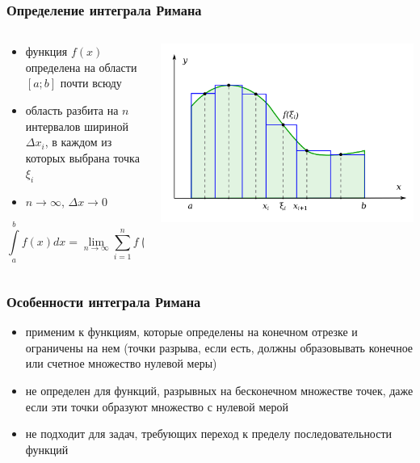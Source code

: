\documentclass[aspectratio=169]{beamer}
\begin{document}
\begin{frame}
\frametitle{Определение интеграла Римана}
\begin{columns}[c]
    \begin{column}{0.45\textwidth}
        \begin{itemize}
            \item функция $f(x)$ определена на области $[a; b]$ почти всюду
            \item область разбита на $n$ интервалов шириной $\Delta x_i$, в каждом из которых выбрана точка $\xi_i$
            \item $n \rightarrow \infty$, $\Delta x \rightarrow 0$
        \end{itemize}

        $$
        \int\limits_a^b f(x) dx = \lim_{n \rightarrow \infty} \sum_{i = 1}^n f(\xi_i) \Delta x_i
        $$
    \end{column}
    \begin{column}{0.45\textwidth}
        \includegraphics[width=\textwidth]{images/riemann_integral.png}
    \end{column}
\end{columns}
\end{frame}

\begin{frame}
\frametitle{Особенности интеграла Римана}
\begin{itemize}
    \item применим к функциям, которые определены на конечном отрезке и ограничены на нем (точки разрыва, если есть, должны образовывать конечное или счетное множество нулевой меры)
    \item не определен для функций, разрывных на бесконечном множестве точек, даже если эти точки образуют множество с нулевой мерой
    \item не подходит для задач, требующих переход к пределу последовательности функций
\end{itemize}
\end{frame}
\end{document}
